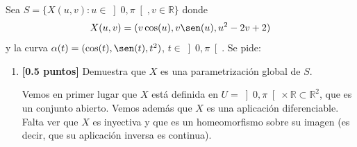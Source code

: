 \documentclass[12pt]{article}
\begin{document}
    \begin{ejercicio}
        Sea $S = \{X(u,v) : u\in \left]0,\pi\right[, v\in \mathbb{R}\}$ donde
        \begin{equation*}
            X(u,v) = (v\cos(u), v\sen(u), u^2-2v+2)
        \end{equation*}
        y la curva $\alpha(t) = (\cos(t), \sen(t),t^2)$, $t\in \left]0,\pi\right[$. Se pide:
        \begin{enumerate}[label=\alph*)]
            \item \textbf{[0.5 puntos]} Demuestra que $X$ es una parametrización global de $S$.

                Vemos en primer lugar que $X$ está definida en $U =\left]0,\pi\right[\times \mathbb{R}\subset\mathbb{R}^2$, que es un conjunto abierto. Vemos además que $X$ es una aplicación diferenciable. Falta ver que $X$ es inyectiva y que es un homeomorfismo sobre su imagen (es decir, que su aplicación inversa es continua).


\end{enumerate}
\end{ejercicio}
\end{document}

